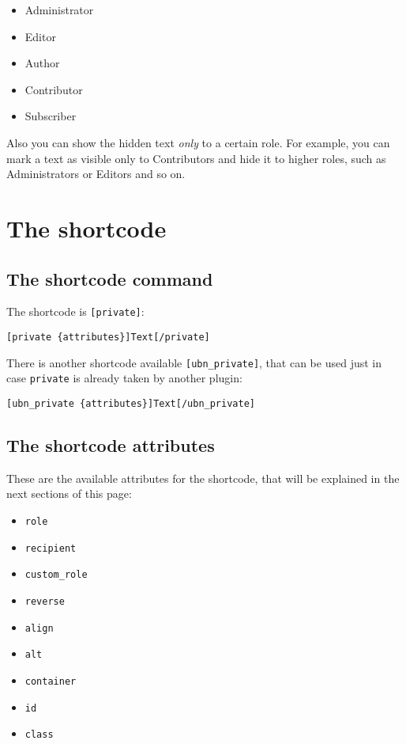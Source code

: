 \begin{itemize}
	\item Administrator
	\item Editor
	\item Author
	\item Contributor
	\item Subscriber
\end{itemize}

Also you can show the hidden text \textit{only} to a certain role. For example,
you can mark a text as visible only to Contributors and hide it to higher roles,
such as Administrators or Editors and so on.

\part{The shortcode}

\chapter{The shortcode command}

The shortcode is \verb+[private]+:

\begin{lstlisting}
[private {attributes}]Text[/private]
\end{lstlisting}

There is another shortcode available \verb+[ubn_private]+, that can be used just
in case \verb+private+ is already taken by another plugin:

\begin{lstlisting}
[ubn_private {attributes}]Text[/ubn_private]
\end{lstlisting}

\chapter{The shortcode attributes}

These are the available attributes for the shortcode, that will be explained in
the next sections of this page:

\begin{itemize}
 \item \verb+role+
 \item \verb+recipient+
 \item \verb+custom_role+
 \item \verb+reverse+
 \item \verb+align+
 \item \verb+alt+
 \item \verb+container+
 \item \verb+id+
 \item \verb+class+
\end{itemize}

